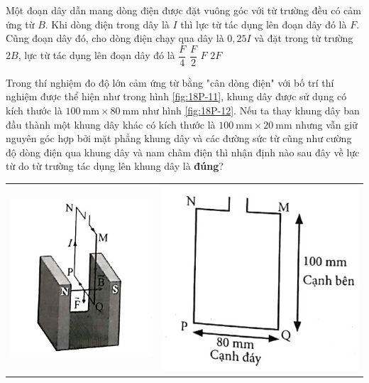 \begin{ex}
	Một đoạn dây dẫn mang dòng điện được đặt vuông góc với từ trường đều có cảm ứng từ $B$. Khi dòng điện trong dây là $I$ thì lực từ tác dụng lên đoạn dây đó là $F$. Cũng đoạn dây đó, cho dòng điện chạy qua dây là $0,25I$ và đặt trong từ trường $2B$, lực từ tác dụng lên đoạn dây đó là
	\choice
	{$\dfrac{F}{4}$}
	{\True $\dfrac{F}{2}$}
	{$F$}
	{$2F$}
	\loigiai{}
\end{ex}
\begin{ex}
	Trong thí nghiệm đo độ lớn cảm ứng từ bằng "cân dòng điện" với bố trí thí nghiệm được thể hiện như trong hình \ref{fig:18P-11}, khung dây được sử dụng có kích thước là $\SI{100}{\milli\meter}\times\SI{80}{\milli\meter}$ như hình \ref{fig:18P-12}. Nếu ta thay khung dây ban đầu thành một khung dây khác có kích thước là $\SI{100}{\milli\meter}\times\SI{20}{\milli\meter}$ nhưng vẫn giữ nguyên góc hợp bởi mặt phẳng khung dây và các đường sức từ cũng như cường độ dòng điện qua khung dây và nam châm điện thì nhận định nào sau đây về lực từ do từ trường tác dụng lên khung dây là \textbf{đúng}?
	\begin{center}
		\begin{tabular}{M{8cm}M{8cm}}
			\includegraphics[width=0.6\linewidth]{../figs/VN12-Y24-PH-SYL-018P-11}
			\label{fig:18P-11}
			&\includegraphics[width=0.6\linewidth]{../figs/VN12-Y24-PH-SYL-018P-12}

\end{tabular}
\end{center}
\end{ex}
